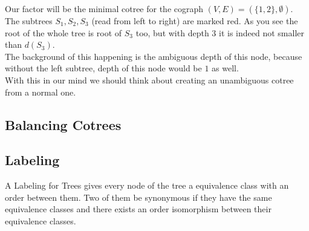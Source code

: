 \documentclass[a4paper,12pt]{article}
\theoremstyle{definition}
\begin{document}
	Our factor will be the minimal cotree for the cograph $(V,E)=(\{1,2\},\emptyset)$. The subtrees $S_1,S_2,S_3$ (read from left to right) are marked red. As you see the root of the whole tree is root of $S_3$ too, but with depth $3$ it is indeed not smaller than $d(S_3)$.\\
	The background of this happening is the ambiguous depth of this node, because without the left subtree, depth of this node would be $1$ as well. \\
	With this in our mind we should think about creating an unambiguous cotree from a normal one. 
	\subsection{Balancing Cotrees}

	\subsection{Labeling}
	A Labeling for Trees gives every node of the tree a equivalence class with an order between them. Two of them be synonymous if they have the same equivalence classes and there exists an order isomorphism between their equivalence classes.
\end{document}
